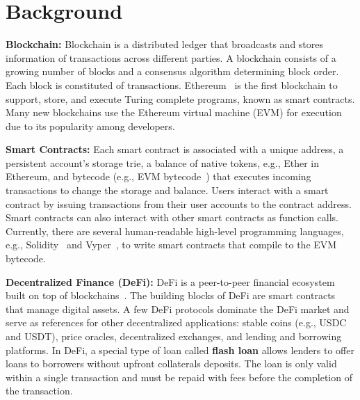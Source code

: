 \section{Background}
\label{sec:background}


\noindent \textbf{Blockchain:}
Blockchain is a distributed ledger that broadcasts and stores information of
transactions across different parties. 
A blockchain consists of a growing
number of blocks and a consensus algorithm determining block order.
Each block is constituted of transactions.
Ethereum~\cite{ethereum22,buterin2014ethereum} is the first blockchain to
support, store, and execute Turing complete programs, known as smart contracts.
Many new blockchains use the Ethereum virtual machine (EVM) 
for execution due to its popularity among developers.




\noindent \textbf{Smart Contracts:}
Each smart contract is associated with a unique address, a
persistent account's storage trie, a balance of native tokens, e.g., Ether in
Ethereum, and bytecode (e.g., EVM
bytecode~\cite{ethereum22,buterin2014ethereum}) that executes incoming
transactions to change the storage and balance. Users interact with a smart
contract by issuing transactions from their user accounts to the contract
address. 
Smart contracts can also interact with other smart contracts as function calls.
Currently, there are several human-readable high-level programming languages,
e.g., Solidity~\cite{solidity} and Vyper~\cite{vyper}, to write smart contracts
that compile to the EVM bytecode. 



\noindent \textbf{Decentralized Finance (DeFi):}
DeFi is a peer-to-peer financial ecosystem built on top of
blockchains~\cite{wust2018you}. The building blocks of DeFi are smart contracts
that manage digital assets. 
A few DeFi protocols dominate the DeFi market and serve as references for other
decentralized applications: stable coins (e.g., USDC and USDT), price oracles,
decentralized exchanges, and lending and borrowing platforms. 
In DeFi, a special type of loan called \textbf{flash
loan} allows lenders to offer loans to borrowers without upfront collaterals
deposits. The loan is only valid within a single transaction and must be repaid
with fees before the completion of the transaction.
 



